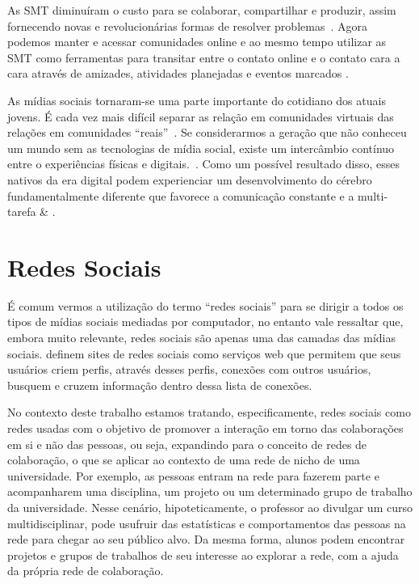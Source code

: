 As SMT diminuíram o custo para se colaborar, compartilhar e produzir,
assim fornecendo novas e revolucionárias formas de resolver problemas~\cite{shirky2010}.
%
Agora podemos manter e acessar comunidades online e ao mesmo tempo utilizar as SMT
como ferramentas para transitar entre o contato online e o contato cara a cara
através de amizades, atividades planejadas e eventos marcados \cite{shirky2010}.

As mídias sociais tornaram-se  uma parte importante do cotidiano dos atuais jovens.
É cada vez mais difícil separar as relação em comunidades virtuais das relações em
comunidades ``reais''~\cite{davis2012}.
%
Se considerarmos a geração que não conheceu um mundo sem as
tecnologias de mídia social, existe um intercâmbio contínuo entre o experiências
físicas e digitais.~\cite{davis2012}.
%
Como um possível resultado disso, esses nativos da era digital podem experienciar um
desenvolvimento do cérebro fundamentalmente diferente que favorece a comunicação
constante e a multi-tarefa \cite{prensky2001} \& \cite{vorgan2009}.

\section{Redes Sociais}

É comum vermos a utilização do termo ``redes sociais'' para se dirigir a todos os
tipos de mídias sociais mediadas por computador, no entanto vale ressaltar que,
embora muito relevante, redes sociais são apenas uma das camadas das mídias sociais.
%
 definem sites de redes sociais como serviços
web que permitem que seus usuários criem perfis, através desses perfis,
conexões com outros usuários, busquem e cruzem informação dentro dessa lista
de conexões.

No contexto deste trabalho estamos tratando, especificamente, redes sociais como redes 
usadas com o objetivo de promover a interação em torno das colaborações em si e
não das pessoas, ou seja, expandindo para o conceito de redes de colaboração, o que
se aplicar ao contexto de uma rede de nicho de uma universidade. 
%
Por exemplo, as pessoas entram na rede para fazerem parte e acompanharem uma disciplina, um projeto
ou um determinado grupo de trabalho da universidade.
%
Nesse cenário, hipoteticamente, o professor ao divulgar um curso multidisciplinar, pode usufruir das estatísticas e
comportamentos das pessoas na rede para chegar ao seu público alvo.
%
Da mesma forma, alunos podem encontrar projetos e grupos de trabalhos de seu interesse ao
explorar a rede, com a ajuda da própria rede de colaboração.

